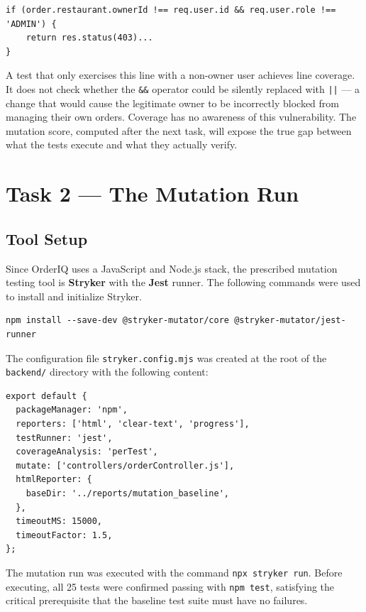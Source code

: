 \documentclass[12pt, a4paper]{article}
\begin{document}
\begin{lstlisting}
if (order.restaurant.ownerId !== req.user.id && req.user.role !== 'ADMIN') {
    return res.status(403)...
}
\end{lstlisting}

A test that only exercises this line with a non-owner user achieves line coverage. It does not check whether the \texttt{\&\&} operator could be silently replaced with \texttt{||} --- a change that would cause the legitimate owner to be incorrectly blocked from managing their own orders. Coverage has no awareness of this vulnerability. The mutation score, computed after the next task, will expose the true gap between what the tests execute and what they actually verify.

\section{Task 2 --- The Mutation Run}

\subsection{Tool Setup}

Since OrderIQ uses a JavaScript and Node.js stack, the prescribed mutation testing tool is \textbf{Stryker} with the \textbf{Jest} runner. The following commands were used to install and initialize Stryker.

\begin{lstlisting}[caption={Stryker installation}]
npm install --save-dev @stryker-mutator/core @stryker-mutator/jest-runner
\end{lstlisting}

The configuration file \texttt{stryker.config.mjs} was created at the root of the \texttt{backend/} directory with the following content:

\begin{lstlisting}[caption={stryker.config.mjs}]
export default {
  packageManager: 'npm',
  reporters: ['html', 'clear-text', 'progress'],
  testRunner: 'jest',
  coverageAnalysis: 'perTest',
  mutate: ['controllers/orderController.js'],
  htmlReporter: {
    baseDir: '../reports/mutation_baseline',
  },
  timeoutMS: 15000,
  timeoutFactor: 1.5,
};
\end{lstlisting}

The mutation run was executed with the command \texttt{npx stryker run}. Before executing, all 25 tests were confirmed passing with \texttt{npm test}, satisfying the critical prerequisite that the baseline test suite must have no failures.
\end{document}
